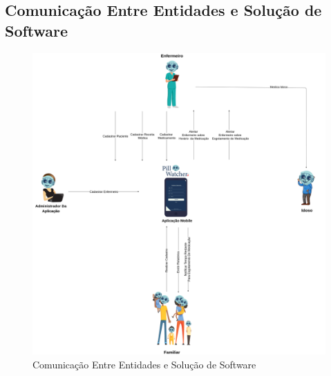 \subsection{Comunicação Entre Entidades e Solução de Software}
\begin{figure}[H]
    \centering
    \includegraphics[width=\textwidth]{figuras/Comunicação Entre Entidades e Solução De Software.png}
    \caption{Comunicação Entre Entidades e Solução de Software}
    \label{fig:Communication_between_entities}
\end{figure}